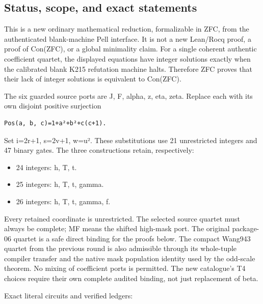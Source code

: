 \documentclass[
  10pt,
]{article}
\providecommand{\tightlist}{%
  \setlength{\itemsep}{0pt}\setlength{\parskip}{0pt}}
\begin{document}
\subsection{Status, scope, and exact
statements}\label{status-scope-and-exact-statements}

This is a new ordinary mathematical reduction, formalizable in ZFC, from
the authenticated blank-machine Pell interface. It is not a new
Lean/Rocq proof, a proof of Con(ZFC), or a global minimality claim. For
a single coherent authentic coefficient quartet, the displayed equations
have integer solutions exactly when the calibrated blank K215 refutation
machine halts. Therefore ZFC proves that their lack of integer solutions
is equivalent to Con(ZFC).

The six guarded source ports are J, F, alpha, z, eta, zeta. Replace each with
its own disjoint positive surjection

\begin{verbatim}
Pos(a, b, c)=1+a²+b²+c(c+1).
\end{verbatim}

Set i=2r+1, s=2v+1, w=u². These substitutions use 21 unrestricted
integers and 47 binary gates. The three constructions retain,
respectively:

\begin{itemize}
\tightlist
\item
  24 integers: h, T, t.
\item
  25 integers: h, T, t, gamma.
\item
  26 integers: h, T, t, gamma, f.
\end{itemize}

Every retained coordinate is unrestricted. The selected source quartet
must always be complete; MF means the shifted high-mask port. The
original package-06 quartet is a safe direct binding for the proofs
below. The compact Wang943 quartet from the previous round is also
admissible through its whole-tuple compiler transfer and the native mask
population identity used by the odd-scale theorem. No mixing of
coefficient ports is permitted. The new catalogue's T4 choices require
their own complete audited binding, not just replacement of beta.

Exact literal circuits and verified ledgers:
\end{document}
